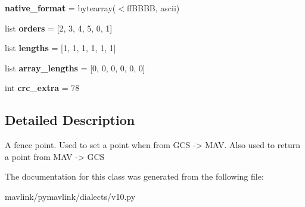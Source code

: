 \begin{DoxyCompactItemize}
\item 
\mbox{\label{classpymavlink_1_1dialects_1_1v10_1_1MAVLink__fence__point__message_a2e8b9adb4729db5e208edcc7636c273b}} 
{\bfseries native\+\_\+format} = bytearray(\textquotesingle{}$<$ff\+B\+B\+BB\textquotesingle{}, \textquotesingle{}ascii\textquotesingle{})
\item 
\mbox{\label{classpymavlink_1_1dialects_1_1v10_1_1MAVLink__fence__point__message_a2b7cdf9f36124dc1e3d07dc83e88d495}} 
list {\bfseries orders} = \mbox{[}2, 3, 4, 5, 0, 1\mbox{]}
\item 
\mbox{\label{classpymavlink_1_1dialects_1_1v10_1_1MAVLink__fence__point__message_a6a2a96d4fc9e666181b1f627a19718fe}} 
list {\bfseries lengths} = \mbox{[}1, 1, 1, 1, 1, 1\mbox{]}
\item 
\mbox{\label{classpymavlink_1_1dialects_1_1v10_1_1MAVLink__fence__point__message_a09f3275448ed5133ea60e088525d6692}} 
list {\bfseries array\+\_\+lengths} = \mbox{[}0, 0, 0, 0, 0, 0\mbox{]}
\item 
\mbox{\label{classpymavlink_1_1dialects_1_1v10_1_1MAVLink__fence__point__message_af587f0cf11850672c793989ac8681ac1}} 
int {\bfseries crc\+\_\+extra} = 78
\end{DoxyCompactItemize}


\subsection{Detailed Description}
\begin{DoxyVerb}A fence point. Used to set a point when from GCS -> MAV. Also
used to return a point from MAV -> GCS
\end{DoxyVerb}
 

The documentation for this class was generated from the following file\+:\begin{DoxyCompactItemize}
\item 
mavlink/pymavlink/dialects/v10.\+py\end{DoxyCompactItemize}
